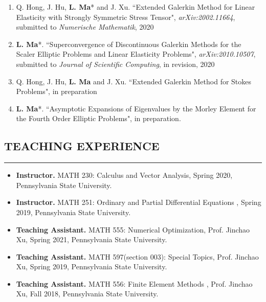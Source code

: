 \documentclass[10pt,a4]{article}
\begin{document}
\begin{small}
\begin{enumerate}
	\item Q. Hong, J. Hu, \textbf{L. Ma}* and J. Xu. ``Extended Galerkin Method for Linear Elasticity with Strongly Symmetric Stress Tensor", {\it arXiv:2002.11664}, submitted to   {\it Numerische Mathematik}, 2020
	
	\item \textbf{L. Ma}*. ``Superconvergence of Discontinuous Galerkin Methods for the Scaler Elliptic Problems and Linear Elasticity Problems", {\it arXiv:2010.10507}, submitted to  {\it Journal of Scientific Computing}, in revision, 2020
	
	\item Q. Hong, J. Hu, \textbf{L. Ma} and J. Xu. ``Extended Galerkin Method for Stokes Problems", in preparation
	
	\item \textbf{L. Ma}*. ``Asymptotic Expansions of Eigenvalues by the Morley Element for the Fourth Order Elliptic Problems", in preparation.
    
\end{enumerate}

\subsection*{TEACHING EXPERIENCE}
\hrule
\vspace{0.2cm}

\begin{itemize}

\item {\bf Instructor.} MATH 230:  Calculus and Vector Analysis, Spring 2020, Pennsylvania State University. 

\item {\bf Instructor.} MATH 251: Ordinary and Partial Differential Equations , Spring 2019, Pennsylvania State University.

\item {\bf Teaching Assistant.} MATH 555: Numerical Optimization, Prof. Jinchao Xu, Spring 2021, Pennsylvania State University.

\item {\bf Teaching Assistant.} MATH 597(section 003): Special Topics, Prof. Jinchao Xu, Spring 2019, Pennsylvania State University.

\item {\bf Teaching Assistant.} MATH 556: Finite Element Methods , Prof. Jinchao Xu, Fall 2018, Pennsylvania State University.


\end{itemize}
\end{small}
\end{document}
